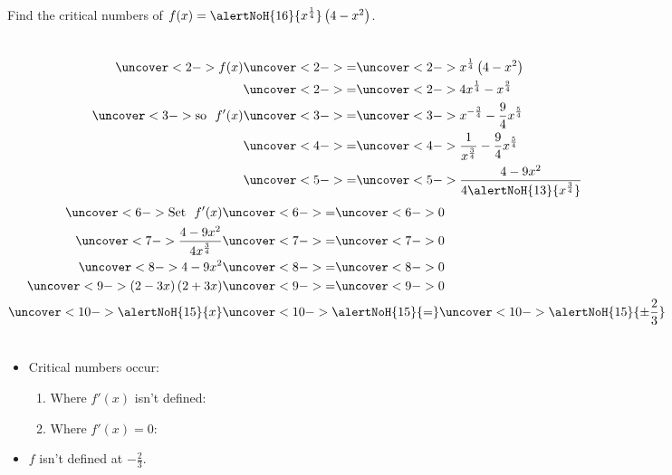 \begin{frame}
\begin{example}
Find the critical numbers of $f(x) = \alertNoH{ 16}{x^{\frac{1}{4}}}\left(4-x^2\right)$.
\begin{columns}[c]
\abovedisplayskip=0pt
\belowdisplayskip=0pt
\abovedisplayshortskip=0pt
\belowdisplayshortskip=0pt
\begin{align*}
\uncover<2->{%
f(x)%
}%
& \uncover<2->{ = } %
\uncover<2->{%
x^{\frac{1}{4}}\left(4-x^2\right)%
}\\%
& \uncover<2->{ = } %
\uncover<2->{%
 4x^{\frac{1}{4}} - x^{\frac{9}{4}}%
}\\%
\uncover<3->{%
\text{so}\ \ f'(x) %
}%
& \uncover<3->{ = } %
\uncover<3->{%
x^{-\frac{3}{4}} - \frac{9}{4} x^{\frac{5}{4}}%
}\\%
& \uncover<4->{ = } %
\uncover<4->{%
\frac{1}{x^{\frac{3}{4}}} - \frac{9}{4} x^{\frac{5}{4}}%
}\\%
& \uncover<5->{ = } %
\uncover<5->{%
\frac{4-9 x^2}{4\alertNoH{ 13}{x^{\frac{3}{4}}}}%
}%
\end{align*}
\abovedisplayskip=0pt
\belowdisplayskip=0pt
\abovedisplayshortskip=0pt
\belowdisplayshortskip=0pt
\begin{align*}
\uncover<6->{\text{Set}\ \ f'(x)}%
& \uncover<6->{ = } %
\uncover<6->{0}\\%
\uncover<7->{%
\frac{4-9 x^2}{4x^{\frac{3}{4}}}%
}%
& \uncover<7->{ = } %
\uncover<7->{%
0 %
}\\%
\uncover<8->{%
4-9 x^2%
}%
& \uncover<8->{ = } %
\uncover<8->{%
0 %
}\\%
\uncover<9->{%
\left( 2- 3x\right) \left( 2 + 3 x\right) %
}%
& \uncover<9->{ = } %
\uncover<9->{%
0 %
}\\%
\uncover<10->{%
\alertNoH{ 15}{x} %
}%
& \uncover<10->{ \alertNoH{ 15}{=} } %
\uncover<10->{%
\alertNoH{ 15}{\pm \frac{2}{3}} %
}%
\end{align*}
\end{columns}
\begin{itemize}
\item<11->  Critical numbers occur:
\begin{enumerate}
\item<11-| alert@12-13>  Where $f'(x)$ isn't defined: 
\item<11-| alert@14-15>  Where $f'(x) = 0$: 
\end{enumerate}
\item<16-| alert@16>  $f$ isn't defined at $-\frac{2}{3}$. 
\end{itemize}
\end{example}
\end{frame}

